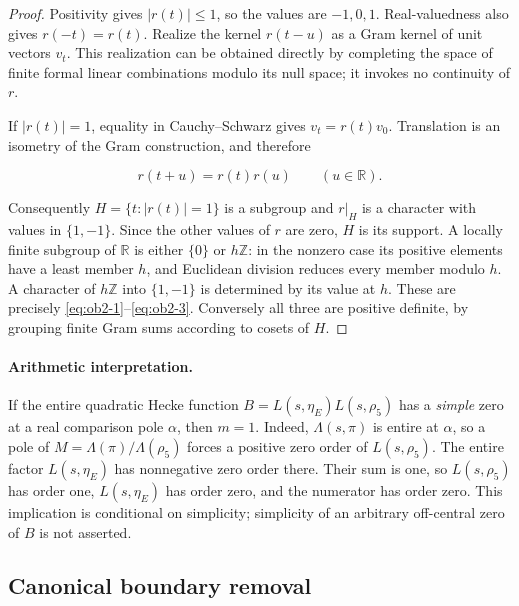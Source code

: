 \begin{proof} Positivity gives \(|r(t)|\le1\), so the values are \(-1,0,1\). Real-valuedness also gives \(r(-t)=r(t)\). Realize the kernel \(r(t-u)\) as a Gram kernel of unit vectors \(v_t\). This realization can be obtained directly by completing the space of finite formal linear combinations modulo its null space; it invokes no continuity of \(r\).

If \(|r(t)|=1\), equality in Cauchy--Schwarz gives \(v_t=r(t)v_0\). Translation is an isometry of the Gram construction, and therefore

\begin{equation}\label{eq:ob2-4}
r(t+u)=r(t)r(u)\qquad(u\in\mathbb R).
\end{equation}

Consequently \(H=\{t:|r(t)|=1\}\) is a subgroup and \(r|_H\) is a character with values in \(\{1,-1\}\). Since the other values of \(r\) are zero, \(H\) is its support. A locally finite subgroup of \(\mathbb R\) is either \(\{0\}\) or \(h\mathbb Z\): in the nonzero case its positive elements have a least member \(h\), and Euclidean division reduces every member modulo \(h\). A character of \(h\mathbb Z\) into \(\{1,-1\}\) is determined by its value at \(h\). These are precisely \eqref{eq:ob2-1}--\eqref{eq:ob2-3}. Conversely all three are positive definite, by grouping finite Gram sums according to cosets of \(H\). \end{proof}

\paragraph{Arithmetic interpretation.}

If the entire quadratic Hecke function \(B=L(s,\eta_E)L(s,\rho_5)\) has a \emph{simple} zero at a real comparison pole \(\alpha\), then \(m=1\). Indeed, \(\Lambda(s,\pi)\) is entire at \(\alpha\), so a pole of \(M=\Lambda(\pi)/\Lambda(\rho_5)\) forces a positive zero order of \(L(s,\rho_5)\). The entire factor \(L(s,\eta_E)\) has nonnegative zero order there. Their sum is one, so \(L(s,\rho_5)\) has order one, \(L(s,\eta_E)\) has order zero, and the numerator has order zero. This implication is conditional on simplicity; simplicity of an arbitrary off-central zero of \(B\) is not asserted.

\subsection{Canonical boundary removal}

